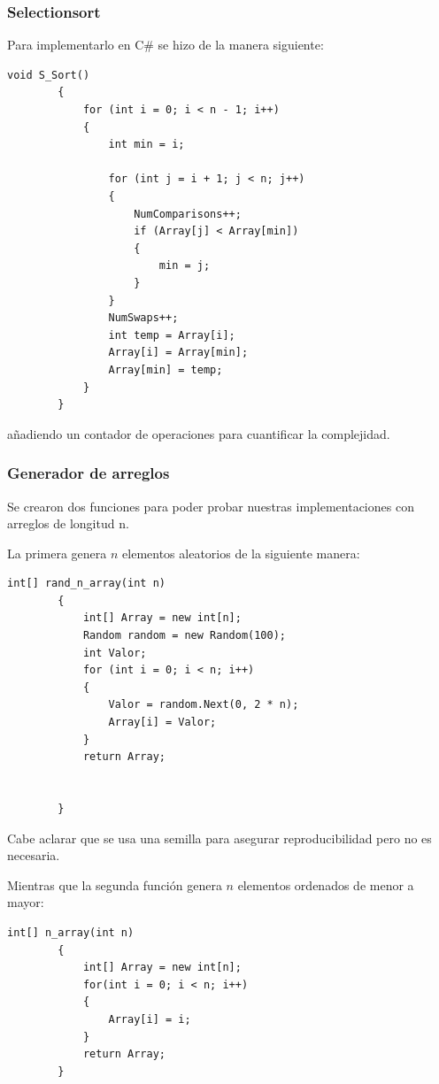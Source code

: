 \documentclass[conference]{IEEEtran}
\begin{document}
\subsubsection{Selectionsort}
Para implementarlo en C\# se hizo de la manera siguiente:
\begin{verbatim}
void S_Sort()
        {
            for (int i = 0; i < n - 1; i++)
            {
                int min = i;

                for (int j = i + 1; j < n; j++)
                {
                    NumComparisons++;
                    if (Array[j] < Array[min])
                    {
                        min = j;
                    }
                }
                NumSwaps++;
                int temp = Array[i];
                Array[i] = Array[min];
                Array[min] = temp;
            }
        }
\end{verbatim}
añadiendo un contador de operaciones para cuantificar la complejidad.

\subsubsection{Generador de arreglos}
Se crearon dos funciones para poder probar nuestras implementaciones con arreglos de longitud n.\par
La primera genera $n$ elementos aleatorios de la siguiente manera:

\begin{verbatim}
int[] rand_n_array(int n)
        {
            int[] Array = new int[n];
            Random random = new Random(100);
            int Valor;
            for (int i = 0; i < n; i++)
            {
                Valor = random.Next(0, 2 * n);
                Array[i] = Valor;
            }
            return Array;


        }
\end{verbatim}

Cabe aclarar que se usa una semilla para asegurar reproducibilidad pero no es necesaria.\par
Mientras que la segunda función genera $n$ elementos ordenados de menor a mayor:

\begin{verbatim}
int[] n_array(int n)
        {
            int[] Array = new int[n];
            for(int i = 0; i < n; i++)
            {
                Array[i] = i;
            }
            return Array;
        }
\end{verbatim}
\end{document}
